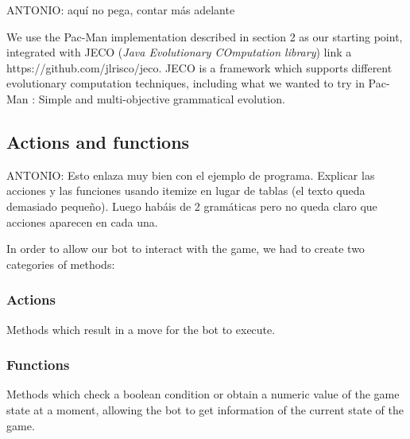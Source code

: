 \documentclass{llncs}
\newcommand{\paco}{Pac-Man }
\begin{document}
{\color{red}ANTONIO: aquí no pega, contar más adelante}

We use the \paco implementation described in section 2 as our starting point, integrated with JECO (\textit{Java Evolutionary COmputation library}) {\color{red} link a https://github.com/jlrisco/jeco}. JECO is a framework which supports different evolutionary computation techniques, including what we wanted to try in \paco: Simple and multi-objective grammatical evolution.


\subsection{Actions and functions}

{\color{red}ANTONIO: Esto enlaza muy bien con el ejemplo de programa. Explicar las acciones y las funciones usando itemize en lugar de tablas (el texto queda demasiado pequeño). Luego habáis de 2 gramáticas pero no queda claro que acciones aparecen en cada una.}

In order to allow our bot to interact with the game, we had to create two categories of methods:

\subsubsection{Actions}
Methods which result in a move for the bot to execute.
\subsubsection{Functions}
Methods which check a boolean condition or obtain a numeric value of the game state at a moment, allowing the bot to get information of the current state of the game.

\begin{table}[]
\centering
{}
\caption{Actions used}
\label{my-label}
\end{table}
\end{document}
